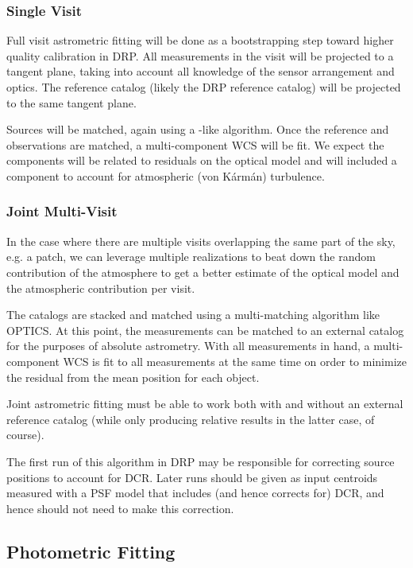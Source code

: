 \subsubsection{Single Visit}
\label{sec:acSingleVisitAstrometricFit}
Full visit astrometric fitting will be done as a bootstrapping step toward higher quality calibration in DRP.  All measurements in the visit will be projected to a tangent plane, taking into account all knowledge of the sensor arrangement and optics.  The reference catalog (likely the DRP reference catalog) will be projected to the same tangent plane.

Sources will be matched, again using a \cite{2007PASA...24..189T}-like algorithm.  Once the reference and observations are matched, a multi-component WCS will be fit.  We expect the components will be related to residuals on the optical model and will included a component to account for atmospheric (von K\'{a}rm\'{a}n) turbulence.

\subsubsection{Joint Multi-Visit}
\label{sec:acJointAstrometricFit}
In the case where there are multiple visits overlapping the same part of the sky, e.g. a patch, we can leverage multiple realizations to beat down the random contribution of the atmosphere to get a better estimate of the optical model and the atmospheric contribution per visit.

The catalogs are stacked and matched using a multi-matching algorithm like OPTICS.  At this point, the measurements can be matched to an external catalog for the purposes of absolute astrometry.  With all measurements in hand, a multi-component WCS is fit to all measurements at the same time on order to minimize the residual from the mean position for each object.

Joint astrometric fitting must be able to work both with and without an external reference catalog (while only producing relative results in the latter case, of course).

The first run of this algorithm in DRP may be responsible for correcting source positions to account for DCR.  Later runs should be given as input centroids measured with a PSF model that includes (and hence corrects for) DCR, and hence should not need to make this correction.

\subsection{Photometric Fitting}
\label{sec:acPhotometricFitting}
